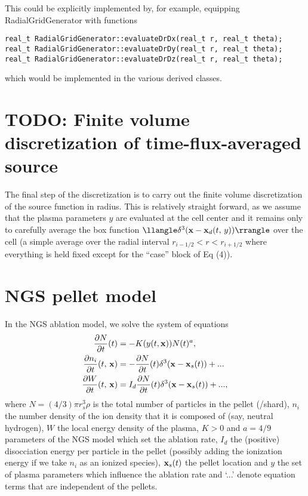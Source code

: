 \documentclass[11pt,a4paper]{article}
\renewcommand{\b}[1]{\ensuremath{ {\bf #1 } }}
\begin{document}
This could be explicitly implemented by, for example, equipping RadialGridGenerator with functions
\begin{verbatim}
real_t RadialGridGenerator::evaluateDrDx(real_t r, real_t theta);
real_t RadialGridGenerator::evaluateDrDy(real_t r, real_t theta);
real_t RadialGridGenerator::evaluateDrDz(real_t r, real_t theta);
\end{verbatim}
which would be implemented in the various derived classes. 

\section*{TODO: Finite volume discretization of time-flux-averaged source}
The final step of the discretization is to carry out the finite volume discretization of the source function in radius. This is relatively straight forward, as we assume that the plasma parameters $y$ are evaluated at the cell center and it remains only to carefully average the box function $\llangle\delta^3( \b{x} - \b{x}_d(t,\,y)) \rrangle $ over the cell (a simple average over the radial interval $r_{i-1/2} < r < r_{i+1/2}$ where everything is held fixed except for the ``case'' block of Eq (4)).





\section*{NGS pellet model}
In the NGS ablation model, we solve the system of equations
\begin{align}
\frac{\partial N}{\partial t}(t) &= - K(y(t,\b{x})) N(t)^{a}, \\
\frac{\partial n_i}{\partial t}(t,\,\b{x}) &= - \frac{\partial N}{\partial t}(t)\delta^3(\b{x} - \b{x}_s(t)) + ...\\
\frac{\partial W}{\partial t}(t,\,\b{x}) &= I_d \frac{\partial N}{\partial t}(t) \delta^3(\b{x}-\b{x}_s(t)) + ...,
\end{align}
where $N =(4/3)\pi r_s^3 \rho$ is the total number of particles in the pellet (/shard), $n_i$ the number density of the ion density that it is composed of (say, neutral hydrogen), $W$ the local energy density of the plasma, $K>0$ and $a=4/9$ parameters of the NGS model which set the ablation rate, $I_d$ the (positive) disocciation energy per particle in the pellet (possibly adding the ionization energy if we take $n_i$ as an ionized species), $\b{x}_s(t)$ the pellet location and $y$ the set of plasma parameters which influence the ablation rate and `...' denote equation terms that are independent of the pellets.
\end{document}
